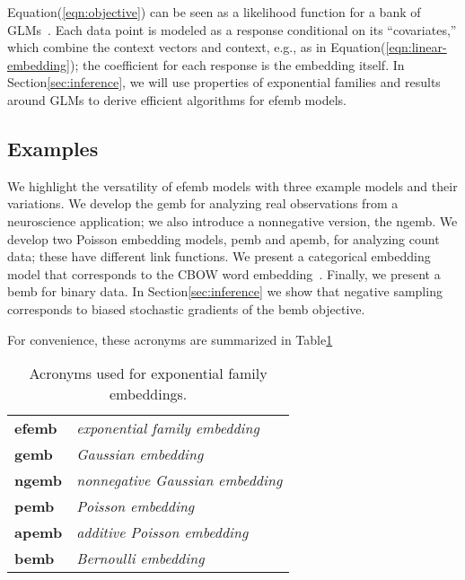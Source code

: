 \documentclass[12pt]{article}
\begin{document}
Equation\nobreakspace \textup {(\ref {eqn:objective})} can be seen as a likelihood function for a bank
of \glspl{GLM}~\citep{mccullagh1989generalized}.  Each data point is
modeled as a response conditional on its ``covariates,'' which combine
the context vectors and context, e.g., as in
Equation\nobreakspace \textup {(\ref {eqn:linear-embedding})}; the coefficient for each response is the
embedding itself.  In Section\nobreakspace \ref {sec:inference}, we will use properties of
exponential families and results around \glspl{GLM} to derive
efficient algorithms for \gls{efemb} models.

\subsection{Examples}
\label{sec:examples}
We highlight the versatility of \gls{efemb} models with three example
models and their variations. We develop the \gls{gemb} for analyzing
real observations from a neuroscience application; we also introduce a
nonnegative version, the \gls{ngemb}. We develop two Poisson embedding
models, \gls{pemb} and \gls{apemb}, for analyzing count data; these
have different link functions. We present a categorical embedding
model that corresponds to the \gls{CBOW} word
embedding~\citep{mikolov2013efficient}. Finally, we present a
\gls{bemb} for binary data.  In Section\nobreakspace \ref {sec:inference} we show that
negative sampling~\citep{mikolov2013distributed} corresponds to biased
stochastic gradients of the \gls{bemb} objective.

For convenience, these acronyms are summarized in Table\nobreakspace \ref {tab:acronyms}

\begin{table}
  \begin{center}
    \begin{tabular}{ll}
      {\bf \gls{efemb}} & {\it exponential family embedding} \\
      {\bf \gls{gemb}} & {\it Gaussian embedding} \\
      {\bf \gls{ngemb}} & {\it nonnegative Gaussian embedding} \\
      {\bf \gls{pemb}} & {\it Poisson embedding} \\
      {\bf \gls{apemb}} & {\it additive Poisson embedding}\\
      {\bf \gls{bemb}} & {\it Bernoulli embedding}
    \end{tabular}
  \end{center}
  \caption{Acronyms used for exponential family embeddings.}
  \label{tab:acronyms}
\end{table}
\end{document}
